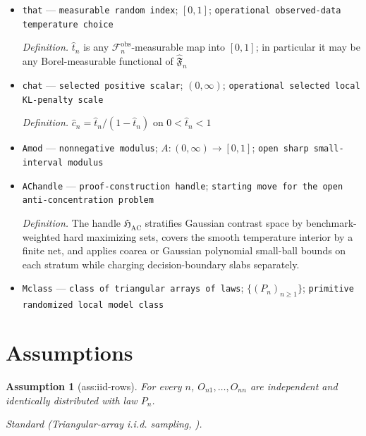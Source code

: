 \documentclass{article}
\newtheorem{assumption}{Assumption}
\begin{document}
\begin{itemize}
  \par\smallskip\noindent\emph{Definition.} \(C_{n,\alpha}=Q^+_{n,\alpha}+\sqrt{\overline\varepsilon_n}+\zeta\)
  \item \texttt{that} --- \texttt{measurable random index}; \([0,1]\); \texttt{operational observed-\allowbreak{}data temperature choice}
  \par\smallskip\noindent\emph{Definition.} \(\widehat t_n\) is any \(\mathcal F_n^{\mathrm{obs}}\)-measurable map into \([0,1]\); in particular it may be any Borel-measurable functional of \(\widehat{\mathfrak F}_n\)
  \item \texttt{chat} --- \texttt{selected positive scalar}; \((0,\infty)\); \texttt{operational selected local KL-\allowbreak{}penalty scale}
  \par\smallskip\noindent\emph{Definition.} \(\widehat c_n=\widehat t_n/(1-\widehat t_n)\) on \(0<\widehat t_n<1\)
  \item \texttt{Amod} --- \texttt{nonnegative modulus}; \(A:(0,\infty)\to[0,1]\); \texttt{open sharp small-\allowbreak{}interval modulus}
  \item \texttt{AChandle} --- \texttt{proof-\allowbreak{}construction handle}; \texttt{starting move for the open anti-\allowbreak{}concentration problem}
  \par\smallskip\noindent\emph{Definition.} The handle \(\mathfrak H_{\mathrm{AC}}\) stratifies Gaussian contrast space by benchmark-weighted hard maximizing sets, covers the smooth temperature interior by a finite net, and applies coarea or Gaussian polynomial small-ball bounds on each stratum while charging decision-boundary slabs separately.
  \item \texttt{Mclass} --- \texttt{class of triangular arrays of laws}; \(\{(P_n)_{n\ge1}\}\); \texttt{primitive randomized local model class}
\end{itemize}

\section{Assumptions}

\begin{assumption}[ass:iid-rows]\label{ass:iid-rows}
For every \(n\), \(O_{n1},\ldots,O_{nn}\) are independent and identically distributed with law \(P_n\).
\par\smallskip\noindent\emph{Standard} (Triangular-array i.i.d. sampling, \cite{ChernozhukovChetverikovKato2014GaussianSuprema}).
\end{assumption}
\end{document}
